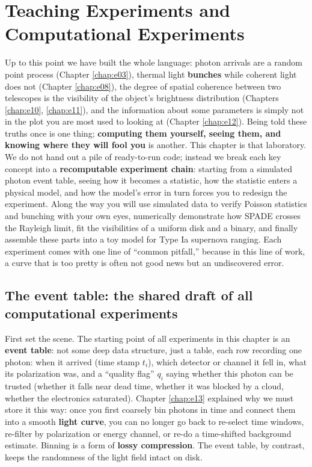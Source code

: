\chapter{Teaching Experiments and Computational Experiments}
\label{chap:e26}

\begin{chapteropening}
Up to this point we have built the whole language: photon arrivals are a random point process (Chapter \ref{chap:e03}), thermal light \textbf{bunches} while coherent light does not (Chapter \ref{chap:e08}), the degree of spatial coherence between two telescopes is the visibility of the object's brightness distribution (Chapters \ref{chap:e10}, \ref{chap:e11}), and the information about some parameters is simply not in the plot you are most used to looking at (Chapter \ref{chap:e12}). Being told these truths once is one thing; \textbf{computing them yourself, seeing them, and knowing where they will fool you} is another. This chapter is that laboratory. We do not hand out a pile of ready-to-run code; instead we break each key concept into a \textbf{recomputable experiment chain}: starting from a simulated photon event table, seeing how it becomes a statistic, how the statistic enters a physical model, and how the model's error in turn forces you to redesign the experiment. Along the way you will use simulated data to verify Poisson statistics and bunching with your own eyes, numerically demonstrate how SPADE crosses the Rayleigh limit, fit the visibilities of a uniform disk and a binary, and finally assemble these parts into a toy model for Type Ia supernova ranging. Each experiment comes with one line of ``common pitfall,'' because in this line of work, a curve that is too pretty is often not good news but an undiscovered error.
\end{chapteropening}

\section{The event table: the shared draft of all computational experiments}
\label{sec:e26-eventtable}

First set the scene. The starting point of all experiments in this chapter is an \textbf{event table}: not some deep data structure, just a table, each row recording one photon: when it arrived (time stamp \(t_i\)), which detector or channel it fell in, what its polarization was, and a ``quality flag'' \(q_i\) saying whether this photon can be trusted (whether it falls near dead time, whether it was blocked by a cloud, whether the electronics saturated). Chapter \ref{chap:e13} explained why we must store it this way: once you first coarsely bin photons in time and connect them into a smooth \textbf{light curve}, you can no longer go back to re-select time windows, re-filter by polarization or energy channel, or re-do a time-shifted background estimate. Binning is a form of \textbf{lossy compression}. The event table, by contrast, keeps the randomness of the light field intact on disk.

